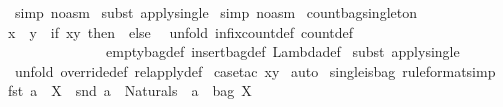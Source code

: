 \begin{isabellebody}
\isamarkupfalse%
\ {\isacharparenleft}simp\ {\isacharparenleft}no{\isacharunderscore}asm{\isacharparenright}{\isacharparenright}\isanewline
{}\isamarkupfalse%
\ {\isacharparenleft}subst\ apply{\isacharunderscore}single{\isacharparenright}\isanewline
{}\isamarkupfalse%
\ {\isacharparenleft}simp\ {\isacharparenleft}no{\isacharunderscore}asm{\isacharparenright}{\isacharparenright}\isanewline
{}\isamarkupfalse%
%
\endisatagproof
{\isafoldproof}%
%
\isadelimproof
\isanewline
%
\endisadelimproof
\isanewline
\isanewline
{}\isamarkupfalse%
\ count{\isacharunderscore}bagsingleton{\isacharcolon}\ \isanewline
{\isachardoublequoteopen}{\isacharpercent}{\isacharbrackleft}x{\isacharpercent}{\isacharbrackright}\ {\isacharbrackleft}{\isacharhash}{\isacharbrackright}\ y\ {\isacharequal}\ {\isacharparenleft}if\ x{\isacharequal}y\ then\ {}\ else\ {}{\isacharparenright}{\isachardoublequoteclose}\isanewline
%
\isadelimproof
%
\endisadelimproof
%
\isatagproof
{}\isamarkupfalse%
\ {\isacharparenleft}unfold\ infixcount{\isacharunderscore}def\ count{\isacharunderscore}def\ \isanewline
\ \ \ \ \ \ \ \ \ \ \ \ \ \ emptybag{\isacharunderscore}def\ insertbag{\isacharunderscore}def\ Lambda{\isacharunderscore}def{\isacharparenright}\isanewline
{}\isamarkupfalse%
\ {\isacharparenleft}subst\ apply{\isacharunderscore}single{\isacharparenright}\isanewline
{}\isamarkupfalse%
\ {\isacharparenleft}unfold\ override{\isacharunderscore}def\ rel{\isacharunderscore}apply{\isacharunderscore}def{\isacharparenright}\isanewline
{}\isamarkupfalse%
\ {\isacharparenleft}case{\isacharunderscore}tac\ {\isachardoublequoteopen}x{\isacharequal}y{\isachardoublequoteclose}{\isacharparenright}\isanewline
{}\isamarkupfalse%
\ auto\isanewline
{}\isamarkupfalse%
%
\endisatagproof
{\isafoldproof}%
%
\isadelimproof
\isanewline
%
\endisadelimproof
\isanewline
\isanewline
{}\isamarkupfalse%
\ single{\isacharunderscore}is{\isacharunderscore}bag\ {\isacharbrackleft}rule{\isacharunderscore}format{\isacharcomma}simp{\isacharbrackright}{\isacharcolon}\ \isanewline
{\isachardoublequoteopen}{\isacharparenleft}{\isacharparenleft}fst\ a{\isacharparenright}\ {\isacharcolon}\ X{\isacharparenright}\ {\isacharminus}{\isacharminus}{\isachargreater}\ {\isacharparenleft}{\isacharparenleft}snd\ a{\isacharparenright}\ {\isacharcolon}\ Naturals{\isacharunderscore}{}{\isacharparenright}\ {\isacharminus}{\isacharminus}{\isachargreater}\ {\isacharparenleft}{\isacharbraceleft}a{\isacharbraceright}\ {\isacharcolon}\ {\isacharparenleft}bag\ X{\isacharparenright}{\isacharparenright}{\isachardoublequoteclose}\isanewline

\end{isabellebody}
